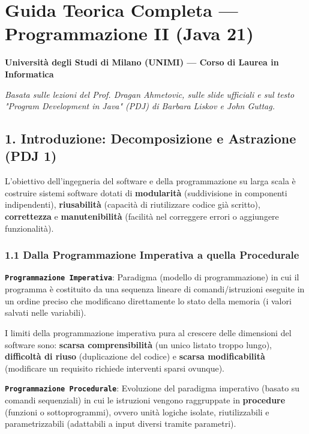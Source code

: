 \section{Guida Teorica Completa — Programmazione II (Java 21)}\label{guida-teorica-completa-programmazione-ii-java-21}

\textbf{Università degli Studi di Milano (UNIMI) — Corso di Laurea in Informatica}

\emph{Basata sulle lezioni del Prof. Dragan Ahmetovic, sulle slide ufficiali e sul testo "Program Development in Java" (PDJ) di Barbara Liskov e John Guttag.}

\subsection{1. Introduzione: Decomposizione e Astrazione (PDJ 1)}\label{1-introduzione-decomposizione-e-astrazione-pdj-1}

L'obiettivo dell'ingegneria del software e della programmazione su larga scala è costruire sistemi software dotati di \textbf{modularità} (suddivisione in componenti indipendenti), \textbf{riusabilità} (capacità di riutilizzare codice già scritto), \textbf{correttezza} e \textbf{manutenibilità} (facilità nel correggere errori o aggiungere funzionalità).

\subsubsection{1.1 Dalla Programmazione Imperativa a quella Procedurale}\label{1-1-dalla-programmazione-imperativa-a-quella-procedurale}

\textbf{\texttt{Programmazione Imperativa}}: Paradigma (modello di programmazione) in cui il programma è costituito da una sequenza lineare di comandi/istruzioni eseguite in un ordine preciso che modificano direttamente lo stato della memoria (i valori salvati nelle variabili).

I limiti della programmazione imperativa pura al crescere delle dimensioni del software sono: \textbf{scarsa comprensibilità} (un unico listato troppo lungo), \textbf{difficoltà di riuso} (duplicazione del codice) e \textbf{scarsa modificabilità} (modificare un requisito richiede interventi sparsi ovunque).

\textbf{\texttt{Programmazione Procedurale}}: Evoluzione del paradigma imperativo (basato su comandi sequenziali) in cui le istruzioni vengono raggruppate in \textbf{procedure} (funzioni o sottoprogrammi), ovvero unità logiche isolate, riutilizzabili e parametrizzabili (adattabili a input diversi tramite parametri).

